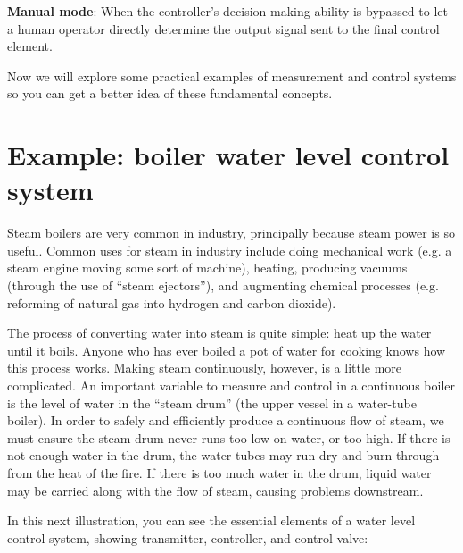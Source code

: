 \vskip 10pt

\noindent
\textbf{Manual mode}: When the controller's decision-making ability is bypassed to let a human operator directly determine the output signal sent to the final control element. 

\vskip 20pt

Now we will explore some practical examples of measurement and control systems so you can get a better idea of these fundamental concepts.








\filbreak
\section{Example: boiler water level control system} 
 
Steam boilers are very common in industry, principally because steam power is so useful.  Common uses for steam in industry include doing mechanical work (e.g. a steam engine moving some sort of machine), heating, producing vacuums (through the use of ``steam ejectors''), and augmenting chemical processes (e.g. reforming of natural gas into hydrogen and carbon dioxide).  

The process of converting water into steam is quite simple: heat up the water until it boils.  Anyone who has ever boiled a pot of water for cooking knows how this process works.  Making steam continuously, however, is a little more complicated.  An important variable to measure and control in a continuous boiler is the level of water in the ``steam drum'' (the upper vessel in a water-tube boiler).  In order to safely and efficiently produce a continuous flow of steam, we must ensure the steam drum never runs too low on water, or too high.  If there is not enough water in the drum, the water tubes may run dry and burn through from the heat of the fire.  If there is too much water in the drum, liquid water may be carried along with the flow of steam, causing problems downstream.

\filbreak

In this next illustration, you can see the essential elements of a water level control system, showing transmitter, controller, and control valve:

